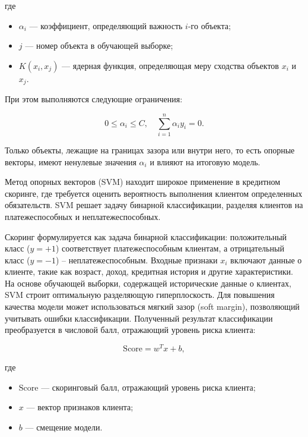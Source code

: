 где

\begin{itemize}
  \item $\alpha_i$ --- коэффициент, определяющий важность $i$-го объекта;
  \item $j$ --- номер объекта в обучающей выборке;
  \item $K(x_i, x_j)$ --- ядерная функция, определяющая меру сходства объектов $x_i$ и $x_j$.
\end{itemize}

При этом выполняются следующие ограничения:

\begin{equation}
  0 \leq \alpha_i \leq C, \quad \sum_{i=1}^{n} \alpha_i y_i = 0.
\end{equation}

Только объекты, лежащие на границах зазора или внутри него, то есть опорные векторы, имеют ненулевые значения $\alpha_i$ и влияют на итоговую модель.

Метод опорных векторов (SVM) находит широкое применение в кредитном скоринге, где требуется оценить вероятность выполнения клиентом определенных обязательств. SVM решает задачу бинарной классификации, разделяя клиентов на платежеспособных и неплатежеспособных.

Скоринг формулируется как задача бинарной классификации: положительный класс ($y = +1$) соответствует платежеспособным клиентам, а отрицательный класс ($y = -1$) -- неплатежеспособным. Входные признаки $x_i$ включают данные о клиенте, такие как возраст, доход, кредитная история и другие характеристики. На основе обучающей выборки, содержащей исторические данные о клиентах, SVM строит оптимальную разделяющую гиперплоскость. Для повышения качества модели может использоваться мягкий зазор (soft margin), позволяющий учитывать ошибки классификации. Полученный результат классификации преобразуется в числовой балл, отражающий уровень риска клиента:

\begin{equation}
  \text{Score} = w^T x + b,
\end{equation}

где

\begin{itemize}
  \item $\text{Score}$ --- скоринговый балл, отражающий уровень риска клиента;
  \item $x$ --- вектор признаков клиента;
  \item $b$ --- смещение модели.
\end{itemize}

